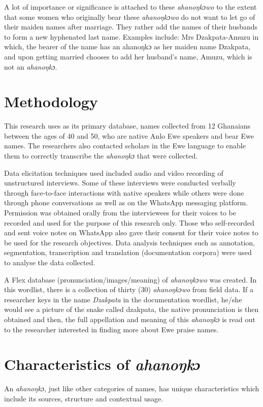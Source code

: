 \documentclass[output=paper]{langscibook}
\begin{document}
A lot of importance or significance is attached to these {\textit{ahanoŋkɔwo}} to the extent that some women who originally bear these {\textit{ahanoŋkɔwo}} do not want to let go of their maiden names after marriage. They rather add the names of their husbands to form a new hyphenated last name. Examples include: Mrs Dzakpata-Amuzu in which, the bearer of the name has an ahanoŋkɔ as her maiden name Dzakpata, and upon getting married chooses to add her husband’s name, Amuzu, which is not an {\textit{ahanoŋkɔ}}.

\section{Methodology}
This research uses as its primary database, names collected from 12 Ghanaians between the ages of 40 and 50, who are native Anlo Ewe speakers and bear Ewe names. The researchers also contacted scholars in the Ewe language to enable them to correctly transcribe the {\textit{ahanoŋkɔ}} that were collected.

\begin{sloppypar}
Data elicitation techniques used included audio and video recording of unstructured interviews. Some of these interviews were conducted verbally through face-to-face interactions with native speakers while others were done through phone conversations as well as on the WhatsApp messaging platform. Permission was obtained orally from the interviewees for their voices to be recorded and used for the purpose of this research only. Those who self-recorded and sent voice notes on WhatsApp also gave their consent for their voice notes to be used for the research objectives. Data analysis techniques such as annotation, segmentation, transcription and translation (documentation corpora) were used to analyse the data collected.
\end{sloppypar}

A Flex database (pronunciation/images/meaning) of {\textit{ahanoŋkɔwo}} was created. In this wordlist, there is a collection of thirty (30) {\textit{ahanoŋkɔwo}} from field data. If a researcher keys in the name \textit{Dzakpata} in the documentation wordlist, he/she would see a picture of the snake called dzakpata, the native pronunciation is then obtained and then, the full appellation  and meaning of this {\textit{ahanoŋkɔ}} is read out to the researcher interested in finding more about Ewe praise names.

\section{Characteristics of \textit{ahanoŋkɔ}}
\begin{sloppypar}
An {\textit{ahanoŋkɔ}}, just like other categories of names, has unique characteristics which include its sources, structure and contextual usage.
\end{sloppypar}
\end{document}

